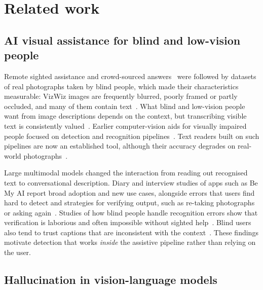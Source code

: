 \section{Related work}\label{sec:related}

\subsection{AI visual assistance for blind and low-vision people}

Remote sighted assistance and crowd-sourced answers~\cite{bigham2010vizwiz} were followed by datasets of real photographs taken by blind people, which made their characteristics measurable: VizWiz images are frequently blurred, poorly framed or partly occluded, and many of them contain text~\cite{gurari2018vizwiz,gurari2020captioning}. What blind and low-vision people want from image descriptions depends on the context, but transcribing visible text is consistently valued~\cite{stangl2020person}. Earlier computer-vision aids for visually impaired people focused on detection and recognition pipelines~\cite{zatserkovnyi2021cv,khan2020insight}. Text readers built on such pipelines are now an established tool, although their accuracy degrades on real-world photographs~\cite{granquist2021evaluation}.

Large multimodal models changed the interaction from reading out recognised text to conversational description. Diary and interview studies of apps such as Be My AI report broad adoption and new use cases, alongside errors that users find hard to detect and strategies for verifying output, such as re-taking photographs or asking again~\cite{gonzalezpenuela2024investigating,xie2025beyond,adnin2024king}. Studies of how blind people handle recognition errors show that verification is laborious and often impossible without sighted help~\cite{alharbi2024misfitting,hong2024understanding}. Blind users also tend to trust captions that are inconsistent with the context~\cite{macleod2017understanding}. These findings motivate detection that works \emph{inside} the assistive pipeline rather than relying on the user.

\subsection{Hallucination in vision-language models}

